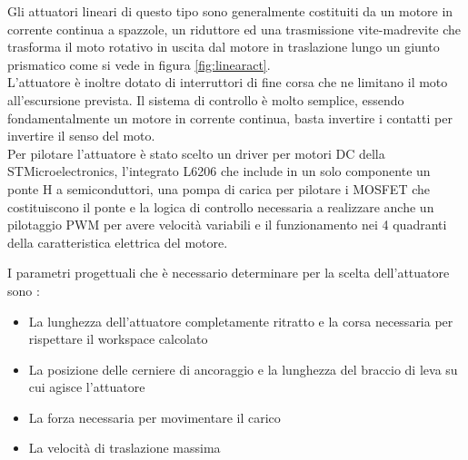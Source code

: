 \documentclass[%
corpo=11pt,
twoside,
 stile=classica,
oldstyle,
greek,%
]{toptesi}
\begin{document}
	Gli attuatori lineari di questo tipo sono generalmente costituiti da un motore in corrente continua a spazzole, un riduttore ed una trasmissione vite-madrevite che trasforma il moto rotativo in uscita dal motore in traslazione lungo un giunto prismatico come si vede in figura \ref{fig:linearact}.\\
	L'attuatore è inoltre dotato di interruttori di fine corsa che ne limitano il moto all'escursione prevista. Il sistema di controllo è molto semplice, essendo fondamentalmente un motore in corrente continua, basta invertire i contatti per invertire il senso del moto.\\ 
	Per pilotare l'attuatore è stato scelto un driver per motori DC della STMicroelectronics, l'integrato L6206 che include in un solo componente un ponte H a semiconduttori, una pompa di carica per pilotare i MOSFET che costituiscono il ponte e la logica di controllo necessaria a realizzare anche un pilotaggio PWM per avere velocità variabili e il funzionamento nei 4 quadranti della caratteristica elettrica del motore. 
	
	I parametri progettuali che è necessario determinare per la scelta dell'attuatore sono :
	\begin{itemize}
		\item La lunghezza dell'attuatore completamente ritratto e la corsa necessaria per rispettare il workspace calcolato
		\item La posizione delle cerniere di ancoraggio e la lunghezza del braccio di leva su cui agisce l'attuatore
		\item La forza necessaria per movimentare il carico 
		\item La velocità di traslazione massima 
	\end{itemize}
	
\end{document}
